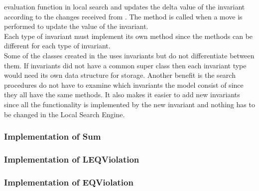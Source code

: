 evaluation function in local search and updates the delta value of the invariant according to the changes 
received from . The method  is called when a move is performed to update the 
value of the invariant. \\ 
Each type of invariant must implement its own method since the methods can be different for each type of invariant. \\ 
Some of the classes created in the  uses invariants but do not differentiate between them. 
If invariants did not have a common super class then each invariant type would need its own data structure for 
storage. Another benefit is the search procedures do not have to examine which invariants the model consist of since 
they 
all have the same methods. It also makes it easier to add new invariants since all the functionality is implemented by 
the new invariant and nothing has to be changed in the Local Search Engine. \\ 
\subsubsection{Implementation of Sum}

\subsubsection{Implementation of LEQViolation}
\subsubsection{Implementation of EQViolation}